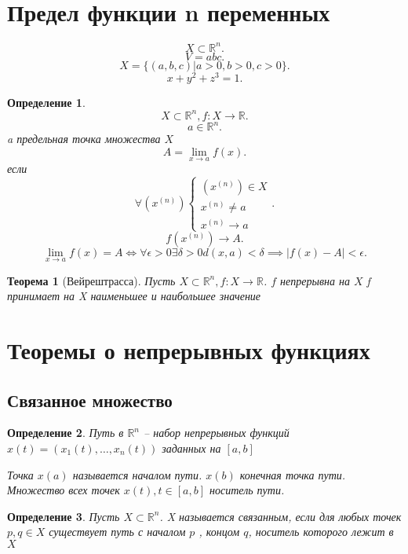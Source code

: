 \documentclass[14pt]{extarticle}
\newtheorem{theorem}{Теорема}
\newtheorem{definition}{Определение}
\begin{document}
\section{Предел функции n переменных}
\[
X \subset \mathbb{R}^{n}
.\] 
\[
V = abc
.\] 
\[
    X = \{ (a,b,c) | a>0,b>0,c>0\}
.\] 
\[
x + y^{2} + z^{3} = 1
.\] 
\begin{definition}
    \[
    X \subset \mathbb{R}^{n}, f : X \to \mathbb{R}
    .\] 
    \[
    a \in \mathbb{R}^{n}
    .\] 
    a предельная точка множества $X$
     \[
    A = \lim_{x \to a} f(x)
    .\] 
    если
    \[
    \forall  (x^{(n)}) 
    \begin{cases}
        (x^{(n)}) \in X\\
        x^{(n)} \neq a\\
        x^{(n)} \to a
    \end{cases}
    .\] 
    \[
    f(x^{(n)}) \to A
    .\] 
    \[
    \lim_{x \to a} f(x) = A \iff \forall  \epsilon > 0 \exists  \delta >0 d(x,a) < \delta \implies |f(x) - A| < \epsilon
    .\] 
\end{definition}
\begin{theorem}[Вейрештрасса]
    Пусть $X \subset \mathbb{R}^{n}, f : X \to \mathbb{R}$. $f$ непрерывна на $X$ 
    f принимает на X наименьшее и наибольшее значение
\end{theorem}
\section{Теоремы о непрерывных функциях}
\subsection{Связанное множество}
\begin{definition}
    Путь в $\mathbb{R}^{n}$ -- набор непрерывных функций $x(t) = ( x_1(t),\dots,x_{n}(t) )$ 
    заданных на $[a,b]$
    
    Точка $x(a)$ называется началом пути.  $x(b)$ конечная точка пути. Множество всех точек $x(t), t \in [a,b]$ носитель пути.
\end{definition}
\begin{definition}
    Пусть $X \subset \mathbb{R}^{n}$. X называется связанным, если для любых точек
    $p,q \in X$ существует путь с началом  $p$ , концом  $q$, носитель которого лежит в $X$
\end{definition}
\end{document}
